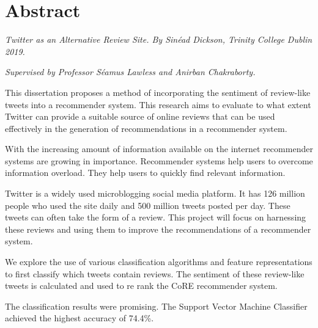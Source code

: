 \chapter{Abstract}


\emph{Twitter as an Alternative Review Site. By Sinéad Dickson, Trinity College Dublin 2019.}

\emph{Supervised by Professor Séamus Lawless and Anirban Chakraborty.}

This dissertation proposes a method of incorporating the sentiment of review-like tweets into a recommender system. This research aims to evaluate to what extent Twitter can provide a suitable source of online reviews that can be used effectively in the generation of recommendations in a recommender system. 

With the increasing amount of information available on the internet recommender systems are growing in importance. Recommender systems help users to overcome information overload. They help users to quickly find relevant information.

Twitter is a widely used microblogging social media platform. It has 126 million people who used the site daily and 500 million tweets posted per day. These tweets can often take the form of a review. This project will focus on harnessing these reviews and using them to improve the recommendations of a recommender system.

We explore the use of various classification algorithms and feature representations to first classify which tweets contain reviews. The sentiment of these review-like tweets is calculated and used to re rank the CoRE recommender system.

The classification results were promising. The Support Vector Machine Classifier achieved the highest accuracy of 74.4\%.









